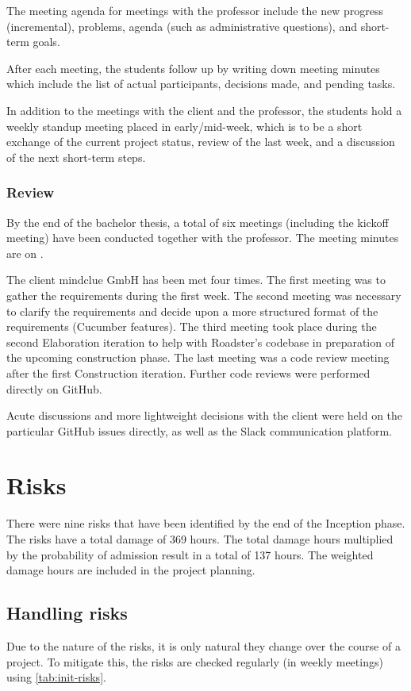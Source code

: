 The meeting agenda for meetings with the professor include the new progress
(incremental), problems, agenda (such as administrative questions), and
short-term goals.

After each meeting, the students follow up by writing down meeting minutes
which include the list of actual participants, decisions made, and pending
tasks.

In addition to the meetings with the client and the professor, the students
hold a weekly standup meeting placed in early/mid-week, which is to be a short
exchange of the current project status, review of the last week, and a
discussion of the next short-term steps.

\subsubsection{Review}
By the end of the bachelor thesis, a total of six meetings (including the
kickoff meeting) have been conducted together with the professor. The meeting
minutes are on \cite[Meetings]{gh:wiki}.

The client mindclue GmbH has been met four times. The first meeting was to
gather the requirements during the first week. The second meeting was necessary
to clarify the requirements and decide upon a more structured format of the
requirements (Cucumber features). The third meeting took place during the
second Elaboration iteration to help with Roadster's codebase in preparation of
the upcoming construction phase. The last meeting was a code review meeting
after the first Construction iteration. Further code reviews were performed
directly on GitHub.

Acute discussions and more lightweight decisions with the client were held on
the particular GitHub issues \cite{gh:issues} directly, as well as the Slack
communication platform.


\section{Risks}
There were nine risks that have been identified by the end of the Inception phase.
The risks have a total damage of 369 hours. The total damage hours multiplied
by the probability of admission result in a total of 137 hours. The weighted damage
hours are included in the project planning.

\subsection{Handling risks}
Due to the nature of the risks, it is only natural they change over the course of a project.
To mitigate this, the risks are checked regularly (in weekly meetings) using \autoref{tab:init-risks}.

